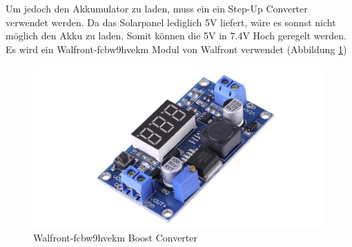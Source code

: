Um jedoch den Akkumulator zu laden, muss ein ein Step-Up Converter verwendet werden. Da das Solarpanel lediglich 5V liefert, wäre es sonnst nicht möglich den Akku zu laden. Somit können die 5V in 7.4V Hoch geregelt werden. Es wird ein Walfront-fcbw9hvekm Modul von Walfront verwendet (Abbildung \ref{fig:walfront})


\begin{figure}
    \centering
    \includegraphics[width=0.5\linewidth]{assets/imagestep_up.png}
    \caption{Walfront-fcbw9hvekm Boost Converter}
    \label{fig:walfront}
    
\end{figure}

